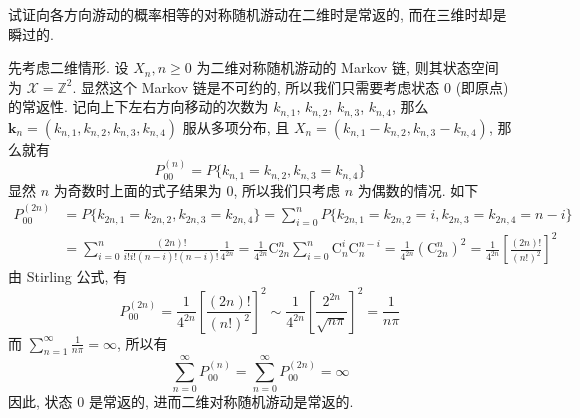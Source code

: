 \documentclass[boxes]{homework}
\begin{document}
\begin{problem}
试证向各方向游动的概率相等的对称随机游动在二维时是常返的, 而在三维时却是瞬过的.
\end{problem}
\begin{solution}
    先考虑二维情形. 设 $X_n, n \ge 0$ 为二维对称随机游动的 Markov 链, 则其状态空间为 $\mathcal{X} = \mathbb{Z}^2$.
    显然这个 Markov 链是不可约的, 所以我们只需要考虑状态 0 (即原点) 的常返性. 记向上下左右方向移动的次数为 $k_{n,1}$,
    $k_{n,2}$, $k_{n,3}$, $k_{n,4}$, 那么 $\boldsymbol{k}_n = (k_{n,1}, k_{n,2}, k_{n,3}, k_{n,4})$
    服从多项分布, 且 $X_n = (k_{n,1} - k_{n,2}, k_{n,3} - k_{n,4})$, 那么就有
    \begin{equation}
        P_{00}^{(n)} = P\{k_{n,1} = k_{n,2}, k_{n,3} = k_{n,4}\}
    \end{equation}
    显然 $n$ 为奇数时上面的式子结果为 0, 所以我们只考虑 $n$ 为偶数的情况. 如下
    \begin{equation}
        \begin{aligned}
            P_{00}^{(2n)}
             & = P\{k_{2n,1} = k_{2n,2}, k_{2n,3} = k_{2n,4}\}
            = \sum_{i = 0}^n P\{k_{2n,1} = k_{2n,2} = i, k_{2n,3} = k_{2n,4} = n - i\} \\
             & = \sum_{i = 0}^n \frac{(2n)!}{i! i! (n - i)! (n - i)!}\frac{1}{4^{2n}}
            = \frac{1}{4^{2n}}\mathrm{C}_{2n}^n \sum_{i = 0}^n \mathrm{C}_{n}^i \mathrm{C}_{n}^{n - i}
            = \frac{1}{4^{2n}}\left(\mathrm{C}_{2n}^n\right)^2
            = \frac{1}{4^{2n}}\left[\frac{(2n)!}{(n!)^2}\right]^2
        \end{aligned}
    \end{equation}
    由 Stirling 公式, 有
    \begin{equation}
        P_{00}^{(2n)} = \frac{1}{4^{2n}}\left[\frac{(2n)!}{(n!)^2}\right]^2 \sim
        \frac{1}{4^{2n}}\left[\frac{2^{2n}}{\sqrt{n\pi}}\right]^2 = \frac{1}{n\pi}
    \end{equation}
    而 $\sum_{n = 1}^\infty \frac{1}{n\pi} = \infty$, 所以有
    \begin{equation}
        \sum_{n = 0}^\infty P_{00}^{(n)} = \sum_{n = 0}^\infty P_{00}^{(2n)} = \infty
    \end{equation}
    因此, 状态 0 是常返的, 进而二维对称随机游动是常返的.


\end{solution}
\end{document}
